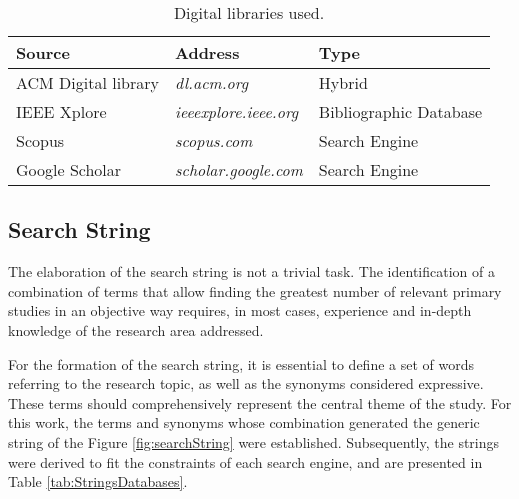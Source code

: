 \begin{table}[!ht]
    \centering
    \footnotesize
    \caption{Digital libraries used.}
    \label{tab:reserchSources}
    \begin{tabular}{m{4cm}m{4cm}m{4cm}}
    \bottomrule
    \rowcolor[HTML]{C0C0C0}
    \textbf{Source} & \textbf{Address} & \textbf{Type} \\ 
    \hline
    ACM Digital library & \textit{dl.acm.org}           & Hybrid\\
    IEEE Xplore         & \textit{ieeexplore.ieee.org}  & Bibliographic Database \\ 
    Scopus       & \textit{scopus.com}   & Search Engine \\
    Google Scholar        & \textit{scholar.google.com}    & Search Engine \\ 
    \bottomrule
    \end{tabular}
\end{table}

\subsection{Search String} \label{ssec_slm:searchString}

The elaboration of the search string is not a trivial task.
The identification of a combination of terms that allow finding the greatest number of relevant primary studies in an objective way requires, in most cases, experience and in-depth knowledge of the research area addressed.

For the formation of the search string, it is essential to define a set of words referring to the research topic, as well as the synonyms considered expressive.
These terms should comprehensively represent the central theme of the study.
For this work, the terms and synonyms whose combination generated the generic string of the Figure \ref{fig:searchString} were established.
Subsequently, the strings were derived to fit the constraints of each search engine, and are presented in Table \ref{tab:StringsDatabases}.

